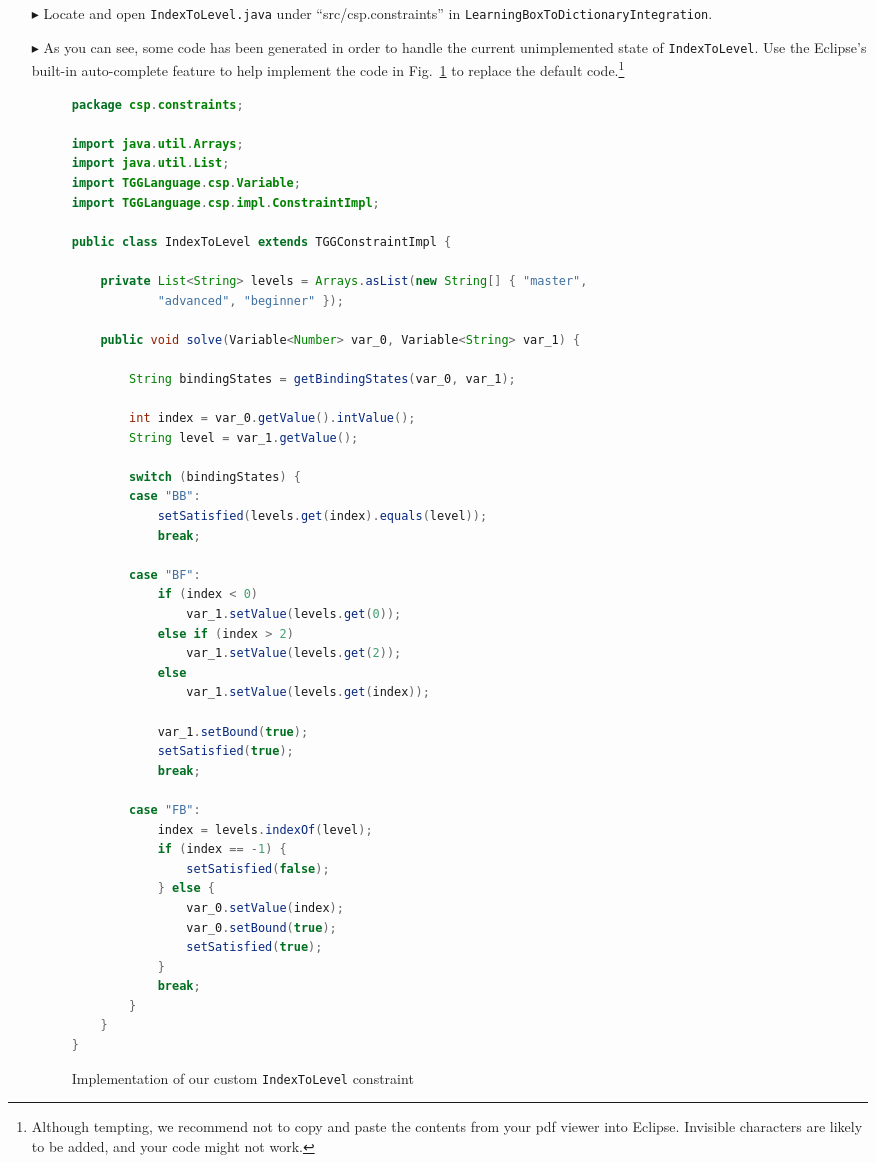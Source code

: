 \begin{itemize}
\item[$\blacktriangleright$] Locate and open \texttt{IndexToLevel.java} under ``src/csp.constraints'' in \texttt{LearningBoxToDictionaryIntegration}.

\item[$\blacktriangleright$] As you can see, some code has been generated in order to handle the current unimplemented state of \texttt{IndexToLevel}. Use the
Eclipse's built-in auto-complete feature to help implement the code in Fig.~\ref{code:indexToLevel} to replace the default code.\footnote{Although tempting, we
recommend not to copy and paste the contents from your pdf viewer into Eclipse. Invisible characters are likely to be added, and your code might not work.}

\begin{figure}[htbp]
\begin{center}
\begin{lstlisting}[language=Java,backgroundcolor=\color{white}, keywordstyle={\bfseries\color{purple}}]
package csp.constraints;

import java.util.Arrays;
import java.util.List;
import TGGLanguage.csp.Variable;
import TGGLanguage.csp.impl.ConstraintImpl;

public class IndexToLevel extends TGGConstraintImpl {

	private List<String> levels = Arrays.asList(new String[] { "master",
			"advanced", "beginner" });

	public void solve(Variable<Number> var_0, Variable<String> var_1) {

		String bindingStates = getBindingStates(var_0, var_1);
		
		int index = var_0.getValue().intValue();
		String level = var_1.getValue();

		switch (bindingStates) {
		case "BB":
			setSatisfied(levels.get(index).equals(level));
			break;

		case "BF":
			if (index < 0)
				var_1.setValue(levels.get(0));
			else if (index > 2)
				var_1.setValue(levels.get(2));
			else
				var_1.setValue(levels.get(index));

			var_1.setBound(true);
			setSatisfied(true);
			break;

		case "FB":
			index = levels.indexOf(level);
			if (index == -1) {
				setSatisfied(false);
			} else {
				var_0.setValue(index);
				var_0.setBound(true);
				setSatisfied(true);
			}
			break;
		}
	}
}
\end{lstlisting}
  \caption{Implementation of our custom \texttt{IndexToLevel} constraint}
  \label{code:indexToLevel}
\end{center}
\end{figure}

\end{itemize}

